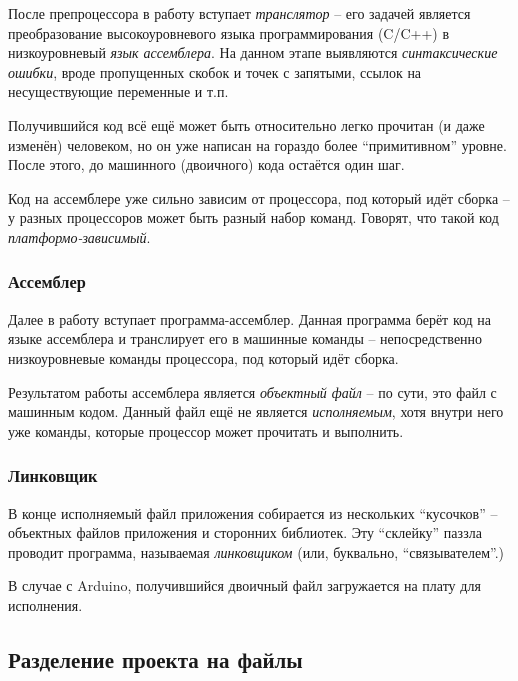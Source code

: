 \documentclass[../sparc.tex]{subfiles}
\begin{document}
После препроцессора в работу вступает \emph{транслятор} -- его задачей является
преобразование высокоуровневого языка программирования (C/C++) в низкоуровневый
\emph{язык ассемблера}.  На данном этапе выявляются \emph{синтаксические
ошибки}, вроде пропущенных скобок и точек с запятыми, ссылок на несуществующие
переменные и т.п.

Получившийся код всё ещё может быть относительно легко прочитан (и даже изменён)
человеком, но он уже написан на гораздо более ``примитивном'' уровне.  После
этого, до машинного (двоичного) кода остаётся один шаг.

Код на ассемблере уже сильно зависим от процессора, под который идёт сборка -- у
разных процессоров может быть разный набор команд.  Говорят, что такой код
\emph{платформо-зависимый}.

\subsubsection{Ассемблер}

Далее в работу вступает программа-ассемблер.  Данная программа берёт код на
языке ассемблера и транслирует его в машинные команды -- непосредственно
низкоуровневые команды процессора, под который идёт сборка.

Результатом работы ассемблера является \emph{объектный файл} -- по сути, это файл
с машинным кодом.  Данный файл ещё не является \emph{исполняемым}, хотя внутри
него уже команды, которые процессор может прочитать и выполнить.

\subsubsection{Линковщик}

В конце исполняемый файл приложения собирается из нескольких ``кусочков'' --
объектных файлов приложения и сторонних библиотек.  Эту ``склейку'' паззла
проводит программа, называемая \emph{линковщиком} (или, буквально,
``связывателем''.)

В случае с Arduino, получившийся двоичный файл загружается на плату для
исполнения.

\subsection{Разделение проекта на файлы}
\label{subsection:multi-file-applications}
\end{document}
